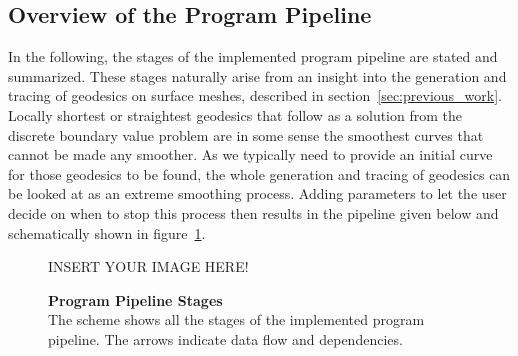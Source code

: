 \documentclass{stdlocal}
\begin{document}
\subsection{Overview of the Program Pipeline} %
\label{sub:program_pipeline}
  In the following, the stages of the implemented program pipeline are stated and summarized.
  These stages naturally arise from an insight into the generation and tracing of geodesics on surface meshes, described in section~\ref{sec:previous_work}.
  Locally shortest or straightest geodesics that follow as a solution from the discrete boundary value problem are in some sense the smoothest curves that cannot be made any smoother.
  As we typically need to provide an initial curve for those geodesics to be found, the whole generation and tracing of geodesics can be looked at as an extreme smoothing process.
  Adding parameters to let the user decide on when to stop this process then results in the pipeline given below and schematically shown in figure~\ref{fig:program-pipeline}.

  \begin{figure}[h]
    \begin{center}
      \large
      INSERT YOUR IMAGE HERE!
    \end{center}
    \caption[Program Pipeline Stages]{%
      \textbf{Program Pipeline Stages}\\
      The scheme shows all the stages of the implemented program pipeline.
      The arrows indicate data flow and dependencies.
    }
    \label{fig:program-pipeline}
  \end{figure}
\end{document}

